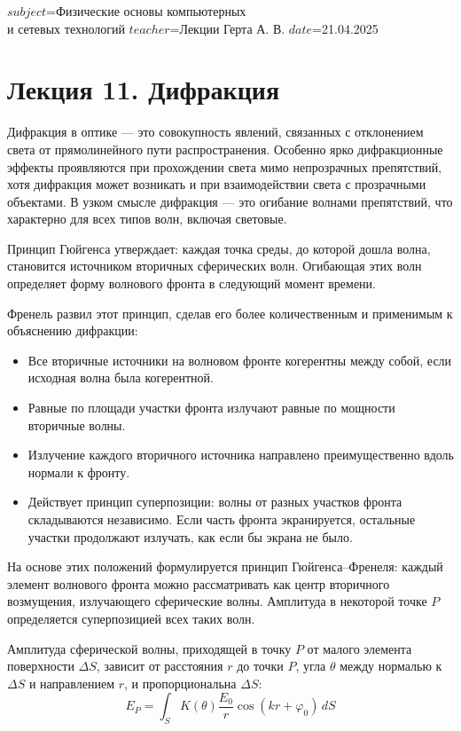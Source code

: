 $subject$=Физические основы компьютерных \\ и сетевых технологий
$teacher$=Лекции Герта А. В.
$date$=21.04.2025

\section{Лекция 11. Дифракция}

Дифракция в оптике — это совокупность явлений, связанных с отклонением света от прямолинейного пути распространения. Особенно ярко дифракционные эффекты проявляются при прохождении света мимо непрозрачных препятствий, хотя дифракция может возникать и при взаимодействии света с прозрачными объектами. В узком смысле дифракция — это огибание волнами препятствий, что характерно для всех типов волн, включая световые.

Принцип Гюйгенса утверждает: каждая точка среды, до которой дошла волна, становится источником вторичных сферических волн. Огибающая этих волн определяет форму волнового фронта в следующий момент времени.

Френель развил этот принцип, сделав его более количественным и применимым к объяснению дифракции:
\begin{itemize}
  \item Все вторичные источники на волновом фронте когерентны между собой, если исходная волна была когерентной.
  \item Равные по площади участки фронта излучают равные по мощности вторичные волны.
  \item Излучение каждого вторичного источника направлено преимущественно вдоль нормали к фронту.
  \item Действует принцип суперпозиции: волны от разных участков фронта складываются независимо. Если часть фронта экранируется, остальные участки продолжают излучать, как если бы экрана не было.
\end{itemize}

На основе этих положений формулируется принцип Гюйгенса–Френеля: каждый элемент волнового фронта можно рассматривать как центр вторичного возмущения, излучающего сферические волны. Амплитуда в некоторой точке $P$ определяется суперпозицией всех таких волн.

Амплитуда сферической волны, приходящей в точку $P$ от малого элемента поверхности $\Delta S$, зависит от расстояния $r$ до точки $P$, угла $\theta$ между нормалью к $\Delta S$ и направлением $r$, и пропорциональна $\Delta S$:
\[ E_P = \int_S K(\theta) \frac{E_0}{r} \cos(kr + \varphi_0)\, dS \]


